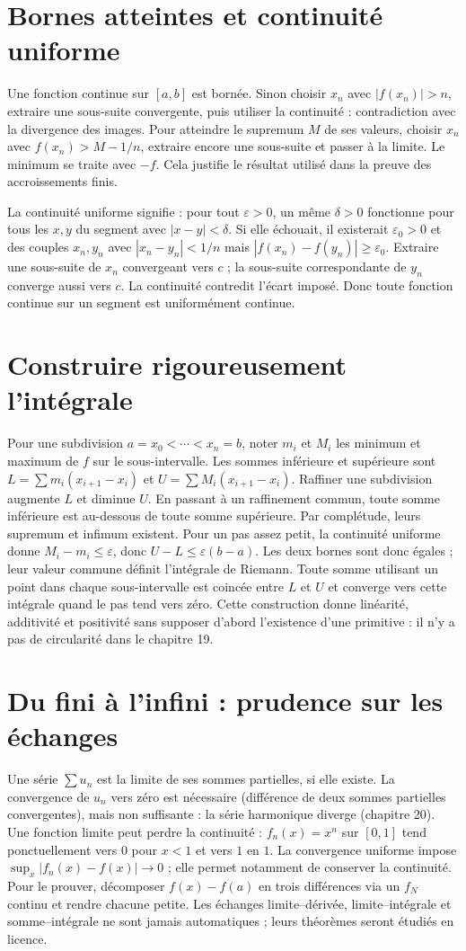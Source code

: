 \documentclass[../cours_tle.tex]{subfiles}
\begin{document}
\section{Bornes atteintes et continuité uniforme}
Une fonction continue sur $[a,b]$ est bornée. Sinon choisir $x_n$ avec $|f(x_n)|>n$, extraire une sous-suite convergente, puis utiliser la continuité : contradiction avec la divergence des images.
Pour atteindre le supremum $M$ de ses valeurs, choisir $x_n$ avec $f(x_n)>M-1/n$, extraire encore une sous-suite et passer à la limite. Le minimum se traite avec $-f$.
Cela justifie le résultat utilisé dans la preuve des accroissements finis.

La continuité uniforme signifie : pour tout $\varepsilon>0$, un même $\delta>0$ fonctionne pour tous les $x,y$ du segment avec $|x-y|<\delta$.
Si elle échouait, il existerait $\varepsilon_0>0$ et des couples $x_n,y_n$ avec $|x_n-y_n|<1/n$ mais $|f(x_n)-f(y_n)|\ge\varepsilon_0$.
Extraire une sous-suite de $x_n$ convergeant vers $c$ ; la sous-suite correspondante de $y_n$ converge aussi vers $c$. La continuité contredit l'écart imposé. Donc toute fonction continue sur un segment est uniformément continue.
\section{Construire rigoureusement l'intégrale}
Pour une subdivision $a=x_0<\cdots<x_n=b$, noter $m_i$ et $M_i$ les minimum et maximum de $f$ sur le sous-intervalle. Les sommes inférieure et supérieure sont
$L=\sum m_i(x_{i+1}-x_i)$ et $U=\sum M_i(x_{i+1}-x_i)$.
Raffiner une subdivision augmente $L$ et diminue $U$. En passant à un raffinement commun, toute somme inférieure est au-dessous de toute somme supérieure.
Par complétude, leurs supremum et infimum existent. Pour un pas assez petit, la continuité uniforme donne $M_i-m_i\le\varepsilon$, donc $U-L\le\varepsilon(b-a)$.
Les deux bornes sont donc égales ; leur valeur commune définit l'intégrale de Riemann. Toute somme utilisant un point dans chaque sous-intervalle est coincée entre $L$ et $U$ et converge vers cette intégrale quand le pas tend vers zéro.
Cette construction donne linéarité, additivité et positivité sans supposer d'abord l'existence d'une primitive : il n'y a pas de circularité dans le chapitre 19.
\section{Du fini à l'infini : prudence sur les échanges}
Une série $\sum u_n$ est la limite de ses sommes partielles, si elle existe. La convergence de $u_n$ vers zéro est nécessaire (différence de deux sommes partielles convergentes), mais non suffisante : la série harmonique diverge (chapitre 20).
Une fonction limite peut perdre la continuité : $f_n(x)=x^n$ sur $[0,1]$ tend ponctuellement vers $0$ pour $x<1$ et vers $1$ en $1$.
La convergence uniforme impose $\sup_x|f_n(x)-f(x)|\to0$ ; elle permet notamment de conserver la continuité. Pour le prouver, décomposer $f(x)-f(a)$ en trois différences via un $f_N$ continu et rendre chacune petite.
Les échanges limite–dérivée, limite–intégrale et somme–intégrale ne sont jamais automatiques ; leurs théorèmes seront étudiés en licence.
\end{document}

